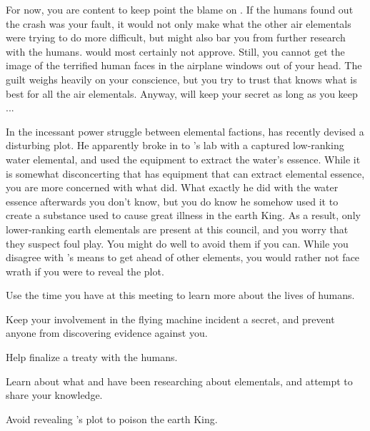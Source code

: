 \documentclass[char]{elementals}
\begin{document}
For now, you are content to keep point the blame on \cJuliet{}.  If the humans found out the crash was your fault, it would not only make what the other air elementals were trying to do more difficult, but might also bar you from further research with the humans.  \cDiplomat{} would most certainly not approve.  Still, you cannot get the image of the terrified human faces in the airplane windows out of your head.  The guilt weighs heavily on your conscience, but you try to trust that \cKing{} knows what is best for all the air elementals. Anyway, \cKing{\they} will keep your secret as long as you keep ...

In the incessant power struggle between elemental factions, \cKing{} has recently devised a disturbing plot.  He apparently broke in to \cGD{}'s lab with a captured low-ranking water elemental, and used the equipment to extract the water's essence.  While it is somewhat disconcerting that \cGD{} has equipment that can extract elemental essence, you are more concerned with what \cKing{} did.  What exactly he did with the water essence afterwards you don't know, but you do know he somehow used it to create a substance used to cause great illness in the earth King.  As a result, only lower-ranking earth elementals are present at this council, and you worry that they suspect foul play.  You might do well to avoid them if you can.  While you disagree with \cKing{}'s means to get ahead of other elements, you would rather not face \cKing{\their} wrath if you were to reveal the plot.

\begin{itemz}[Goals]
  \item Use the time you have at this meeting to learn more about the lives of humans.
  \item Keep your involvement in the flying machine incident a secret, and prevent anyone from discovering evidence against you.
  \item Help \cKing{} finalize a treaty with the humans.
  \item Learn about what \cGD{} and \cScientist{} have been researching about elementals, and attempt to share your knowledge.  
  \item Avoid revealing \cKing{}'s plot to poison the earth King.
\end{itemz}
\end{document}
